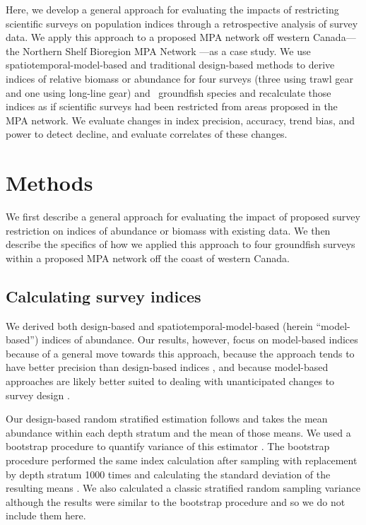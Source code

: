 \documentclass[12pt]{article}
\begin{document}
Here, we develop a general approach for evaluating the impacts of restricting scientific surveys on population indices through a retrospective analysis of survey data.
We apply this approach to a proposed MPA network off western Canada---the Northern Shelf Bioregion MPA Network \citep[][Fig.~\ref{fig:map}]{dfo2022networkactionplan}---as a case study.
We use spatiotemporal-model-based and traditional design-based methods to derive indices of relative biomass or abundance for four surveys (three using trawl gear and one using long-line gear) and \nSpp\ groundfish species and recalculate those indices as if scientific surveys had been restricted from areas proposed in the MPA network.
We evaluate changes in index precision, accuracy, trend bias, and power to detect decline, and evaluate correlates of these changes.

\section*{Methods}

We first describe a general approach for evaluating the impact of proposed survey restriction on indices of abundance or biomass with existing data.
We then describe the specifics of how we applied this approach to four groundfish surveys within a proposed MPA network off the coast of western Canada.

\subsection*{Calculating survey indices}

We derived both design-based and spatiotemporal-model-based (herein ``model-based'') indices of abundance.
Our results, however, focus on model-based indices because of a general move towards this approach, because the approach tends to have better precision than design-based indices \citep{shelton2014, thorson2015a}, and because model-based approaches are likely better suited to dealing with unanticipated changes to survey design \citep{ices2023}.

Our design-based random stratified estimation follows \citet[][p.~91]{cochran1977} and takes the mean abundance within each depth stratum and the mean of those means.
We used a bootstrap procedure to quantify variance of this estimator \citep{schnute2000}.
The bootstrap procedure performed the same index calculation after sampling with replacement by depth stratum 1000 times and calculating the standard deviation of the resulting means \citep{schnute2000}.
We also calculated a classic stratified random sampling variance \citep[][p.~95]{cochran1977} although the results were similar to the bootstrap procedure and so we do not include them here.
\end{document}
